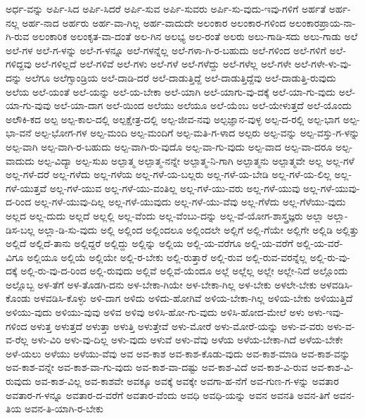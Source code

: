{ಅರ್ಧ-ವನ್ನು
ಅರ್ಪಿ-ಸಿದ
ಅರ್ಪಿ-ಸಿದರೆ
ಅರ್ಪಿ-ಸುವ
ಅರ್ಪಿ-ಸುವರು
ಅರ್ಪಿ-ಸು-ವುದು-ಇವು-ಗಳಿಗೆ
ಅರ್ಹತೆ
ಅರ್ಹ-ನಲ್ಲ
ಅರ್ಹ-ನಾದ
ಅರ್ಹರು
ಅರ್ಹ-ವಾ-ಗಿಲ್ಲ
ಅರ್ಹ-ವಾದುದೇ
ಅಲಂಕಾರ
ಅಲಂಕಾರ-ಗಳಿಂದ
ಅಲಂಕಾರಪ್ರಾಯ-ನಾ-ಗಿ-ರುವ
ಅಲಂಕಾರಿಕ
ಅಲಂಕೃತ-ವಾ-ದಂತೆ
ಅಲ-ಗಿನ
ಅಲಭ್ಯ
ಅಲ-ರಂತೆ
ಅಲರು
ಅಲು-ಗಾಡಿ-ಸದು
ಅಲು-ಗಾಡು
ಅಲೆ
ಅಲೆ-ಗಳ
ಅಲೆ-ಗ-ಳನ್ನು
ಅಲೆ-ಗ-ಳನ್ನೂ
ಅಲೆ-ಗಳನ್ನೆಲ್ಲ
ಅಲೆ-ಗಳಾ-ಗಿ-ರ-ಬಹುದು
ಅಲೆ-ಗಳಿಂದ
ಅಲೆ-ಗಳಿಗೆ
ಅಲೆ-ಗಳಿದ್ದವು
ಅಲೆ-ಗಳಿಲ್ಲದೆ
ಅಲೆ-ಗಳಿವೆ
ಅಲೆ-ಗಳು
ಅಲೆ-ಗಳೆ
ಅಲೆ-ಗಳೆದ್ದು
ಅಲೆ-ಗಳೆಲ್ಲ
ಅಲೆ-ಗಳೇ
ಅಲೆ-ಗಳೇ-ಳು-ವು-ದನ್ನು
ಅಲೆಗೂ
ಅಲೆಗ್ಸಾಂಡ್ರಿಯ
ಅಲೆ-ದಾಡಿ-ದರೆ
ಅಲೆ-ದಾಡುತ್ತಿದ್ದೆ
ಅಲೆ-ದಾಡುತ್ತಿದ್ದೆವು
ಅಲೆ-ದಾಡುತ್ತಿ-ರುವುದು
ಅಲೆಯ
ಅಲೆ-ಯಂತೆ
ಅಲೆ-ಯನ್ನು
ಅಲೆ-ಯ-ಬೇಕಾ
ಅಲೆ-ಯಾಗಿ
ಅಲೆ-ಯಾಗು-ವು-ದಕ್ಕೆ
ಅಲೆ-ಯಾ-ಗು-ವುದು
ಅಲೆ-ಯಾ-ಗು-ವುವು
ಅಲೆ-ಯಾ-ದಾಗ
ಅಲೆ-ಯಿಂದ
ಅಲೆಯು
ಅಲೆಯೂ
ಅಲೆ-ಯೆಂಬ
ಅಲೆ-ಯೇಳುತ್ತದೆ
ಅಲೆ-ಯೊಂದು
ಅಲೌಕಿ-ಕದ
ಅಲ್ಪ
ಅಲ್ಪ-ಕಾಲ-ದಲ್ಲಿ
ಅಲ್ಪಕ್ಷೇತ್ರ-ದಲ್ಲಿ
ಅಲ್ಪ-ಜೀವ-ನವು
ಅಲ್ಪಜ್ಞಾನ-ವುಳ್ಳ
ಅಲ್ಪ-ದ-ರಲ್ಲಿ
ಅಲ್ಪ-ಭಾಗ
ಅಲ್ಪ-ಭಾ-ವನೆ
ಅಲ್ಪ-ಭೋಗ-ಗಳ
ಅಲ್ಪ-ಮಂದಿ
ಅಲ್ಪ-ಮಂದಿಗೆ
ಅಲ್ಪ-ಮತಿ-ಗ-ಳಾದ
ಅಲ್ಪರು
ಅಲ್ಪ-ವನ್ನು
ಅಲ್ಪ-ವಸ್ತು-ಗ-ಳನ್ನು
ಅಲ್ಪ-ವಾಗಿ
ಅಲ್ಪ-ವಾಗಿ-ರ-ಬಹುದು
ಅಲ್ಪ-ವಾಗಿ-ರು-ವುದೊ
ಅಲ್ಪ-ವಾ-ಗು-ವುದು
ಅಲ್ಪ-ವಾದ
ಅಲ್ಪ-ವಾ-ದರೂ
ಅಲ್ಪ-ವಾದುದು
ಅಲ್ಪ-ವಿದ್ಯಾ
ಅಲ್ಪ-ಸುಖ
ಅಲ್ಪಾತ್ಮ
ಅಲ್ಪಾತ್ಮ-ನನ್ನೇ
ಅಲ್ಪಾತ್ಮ-ನಿ-ಗಾಗಿ
ಅಲ್ಪಾತ್ಮನು
ಅಲ್ಪಾತ್ಮವೇ
ಅಲ್ಲ
ಅಲ್ಲ-ಗಳೆ
ಅಲ್ಲ-ಗಳೆ-ದರೆ
ಅಲ್ಲ-ಗಳೆದು
ಅಲ್ಲ-ಗಳೆಯ
ಅಲ್ಲ-ಗಳೆ-ಯ-ಬಲ್ಲರು
ಅಲ್ಲ-ಗಳೆ-ಯ-ಬೇಡಿ
ಅಲ್ಲ-ಗಳೆ-ಯ-ಲಿಲ್ಲ
ಅಲ್ಲ-ಗಳೆ-ಯುತ್ತವೆ
ಅಲ್ಲ-ಗಳೆ-ಯುವ
ಅಲ್ಲ-ಗಳೆ-ಯು-ವಂತಿಲ್ಲ
ಅಲ್ಲ-ಗಳೆ-ಯು-ವರು
ಅಲ್ಲ-ಗಳೆ-ಯುವು
ಅಲ್ಲ-ಗಳೆ-ಯುವು-ದ-ರಿಂದ
ಅಲ್ಲ-ಗಳೆ-ಯುವು-ದಿಲ್ಲ
ಅಲ್ಲ-ಗಳೆ-ಯುವುದು
ಅಲ್ಲ-ಗಳೆ-ಯು-ವೆವು
ಅಲ್ಲ-ಗೆಳೆದು
ಅಲ್ಲ-ಗೆಳೆಯು-ವುದು
ಅಲ್ಲದ
ಅಲ್ಲ-ದುದು
ಅಲ್ಲದೆ
ಅಲ್ಲಲ್ಲಿ
ಅಲ್ಲ-ವೆಂದು
ಅಲ್ಲ-ವೆಂಬು-ದನ್ನು
ಅಲ್ಲ-ವೆ-ಯೋಗ-ಶಾಸ್ತ್ರಜ್ಞರು
ಅಲ್ಲಾ
ಅಲ್ಲಾ-ಡಿಸ-ಬಲ್ಲ
ಅಲ್ಲಾ-ಡಿ-ಸು-ವುದು
ಅಲ್ಲಿ
ಅಲ್ಲಿಂದ
ಅಲ್ಲಿಂದಲೂ
ಅಲ್ಲಿಂದಲೇ
ಅಲ್ಲಿಗೆ
ಅಲ್ಲಿ-ಗೆಯೇ
ಅಲ್ಲಿಗೇ
ಅಲ್ಲಿಡಿ
ಅಲ್ಲಿತ್ತು
ಅಲ್ಲಿದೆ
ಅಲ್ಲಿದೆ-ತಾನು
ಅಲ್ಲಿದ್ದರೆ
ಅಲ್ಲಿದ್ದು
ಅಲ್ಲಿನ್ನು
ಅಲ್ಲಿಯ
ಅಲ್ಲಿ-ಯ-ವರೆಗೂ
ಅಲ್ಲಿ-ಯ-ವರೆಗೆ
ಅಲ್ಲಿ-ಯ-ವರೆ-ವಿಗೂ
ಅಲ್ಲಿಯೂ
ಅಲ್ಲಿಯೆ
ಅಲ್ಲಿಯೇ
ಅಲ್ಲಿ-ರ-ಬೇಕು
ಅಲ್ಲಿ-ರುತ್ತಾರೆ
ಅಲ್ಲಿ-ರುವ
ಅಲ್ಲಿ-ರುವ-ವರನ್ನೆಲ್ಲ
ಅಲ್ಲಿ-ರು-ವು-ದಕ್ಕೆ
ಅಲ್ಲಿ-ರು-ವು-ದ-ರಿಂದ
ಅಲ್ಲಿ-ರುವುದು
ಅಲ್ಲಿವೆ
ಅಲ್ಲಿವೆ-ಯೆಂದೂ
ಅಲ್ಲೆ
ಅಲ್ಲೆಲ್ಲ
ಅಲ್ಲೇ
ಅಲ್ಲೇ-ನಿದೆ
ಅಲ್ಲೊಂದು
ಅಲ್ಲೊಬ್ಬ
ಅಳ-ತೆಗೆ
ಅಳ-ತೊಡಗಿ-ದನು
ಅಳ-ಬೇಕಾ-ಗಿಯೇ
ಅಳ-ಬೇಕಾ-ಗಿಲ್ಲ
ಅಳ-ಬೇಕು
ಅಳಲೇ-ಬೇಕು
ಅಳವಡಿಸಿ-ಕೊಂಡು
ಅಳವಡಿಸಿ-ಕೊಳ್ಳು
ಅಳಿ-ದಾಗ
ಅಳಿದು
ಅಳಿದು-ಹೋಗಿವೆ
ಅಳಿಯ-ಬೇಕಾ-ಗಿಲ್ಲ
ಅಳಿಯ-ಬೇಕು
ಅಳಿಯುತ್ತಿದೆ
ಅಳಿಯು-ವುದು
ಅಳಿಯು-ವುವು
ಅಳಿವ
ಅಳಿವು
ಅಳಿಸಿ-ಹೋ-ಗು-ವುದು
ಅಳಿಸಿ-ಹೋದ-ಮೇಲೆ
ಅಳು
ಅಳು-ಇವು-ಗಳಿಂದ
ಅಳುತ್ತ
ಅಳುತ್ತದೆ
ಅಳುತ್ತಾ
ಅಳುತ್ತಿ
ಅಳುತ್ತೇವೆ
ಅಳು-ಮೋರೆ
ಅಳು-ಮೋರೆ-ಯನ್ನು
ಅಳು-ವ-ವರು
ಅಳು-ವ-ವ-ರೆಲ್ಲ
ಅಳು-ವಿರಿ
ಅಳು-ವು-ದಿಲ್ಲ
ಅಳು-ವುದು
ಅಳುವೆ
ಅಳು-ವೆವು
ಅಳೆಯ
ಅಳೆಯ-ಬೇಕಾ-ಗಿದೆ
ಅಳೆಯ-ಬೇಕೇ
ಅಳೆ-ಯಲು
ಅಳೆಯು
ಅಳೆಯು-ವೆವು
ಅವ
ಅವ-ಕಾಶ
ಅವ-ಕಾಶ-ಕೊಡು-ವುದು
ಅವ-ಕಾಶ-ಮಾಡಿ
ಅವ-ಕಾಶ-ವನ್ನು
ಅವ-ಕಾಶ-ವನ್ನೇ
ಅವ-ಕಾಶ-ವಾ-ಗು-ವುದು
ಅವ-ಕಾಶ-ವಾ-ದಷ್ಟು
ಅವ-ಕಾಶ-ವಿದೆ
ಅವ-ಕಾಶ-ವಿ-ರುವ
ಅವ-ಕಾಶ-ವಿ-ರುವುದು
ಅವ-ಕಾಶ-ವಿಲ್ಲ
ಅವ-ಕಾಶವೇ
ಅವಕ್ಕೂ
ಅವಕ್ಕೆ
ಅವಕ್ಕೇ
ಅವಗಾ-ಹ-ನೆಗೆ
ಅವ-ಗುಣ-ಗ-ಳನ್ನು
ಅವತಾರ
ಅವತಾರ-ಗ-ಳನ್ನೂ
ಅವತಾರ-ದ-ವರೆಗೆ
ಅವತಾರ-ವೆಂದು
ಅವಧಿ
ಅವಧಿ-ಯನ್ನು
ಅವನ
ಅವನತಿ
ಅವನ-ತಿಗೆ
ಅವನ-ತಿಯ
ಅವನ-ತಿ-ಯಾಗಿ-ರ-ಬೇಕು
}
